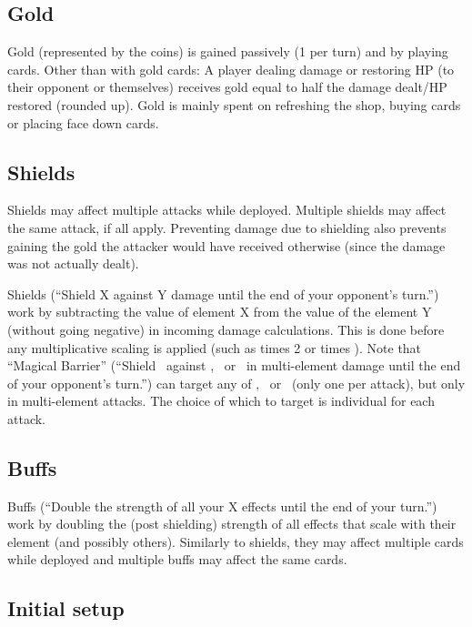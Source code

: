 \documentclass[dvipsnames,parskip,a4paper]{scrartcl}
\newcommand{\iconsize}{3.4mm}
\newcommand{\icondepth}{0.45mm}
\newcommand{\icon}[1]{\raisebox{-\icondepth}{\texttt{[image:  \#1 ]}}}
\newcommand{\fire}{\icon{icons/fire.png}}
\newcommand{\earth}{\icon{icons/earth.png}}
\newcommand{\water}{\icon{icons/water.png}}
\newcommand{\magic}{\icon{icons/magic.png}}
\begin{document}
\subsection*{Gold}

Gold (represented by the coins) is gained passively (1 per turn) and by playing cards. Other than with gold cards: A player dealing damage or restoring HP (to their opponent or themselves) receives gold equal to half the damage dealt/HP restored (rounded up). Gold is mainly spent on refreshing the shop, buying cards or placing face down cards.

\subsection*{Shields}

Shields may affect multiple attacks while deployed. Multiple shields may affect the same attack, if all apply. Preventing damage due to shielding also prevents gaining the gold the attacker would have received otherwise (since the damage was not actually dealt).

\vspace{4pt}

Shields (``Shield X against Y damage until the end of your opponent's turn.'') work by subtracting the value of element X from the value of the element Y (without going negative) in incoming damage calculations. This is done before any multiplicative scaling is applied (such as times 2 or times \magic). Note that ``Magical Barrier'' (``Shield \magic \ against \fire, \earth \ or \water \ in multi-element damage until the end of your opponent's turn.'') can target any of \fire, \earth \ or \water \ (only one per attack), but only in multi-element attacks. The choice of which to target is individual for each attack.

\subsection*{Buffs}

Buffs (``Double the strength of all your X effects until the end of your turn.'') work by doubling the (post shielding) strength of all effects that scale with their element (and possibly others). Similarly to shields, they may affect multiple cards while deployed and multiple buffs may affect the same cards.

\subsection*{Initial setup}
\end{document}
